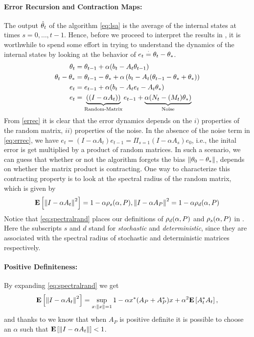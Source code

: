 \paragraph{Error Recursion and Contraction Maps:}
The output $\hat{\theta}_t$ of the algorithm \eqref{eq:lsa} is the average of the internal states at times $s=0,\ldots,t-1$. Hence, before we proceed to interpret the results in , it is worthwhile to spend some effort in trying to understand the dynamics of the internal states by looking at the behavior of $e_t\stackrel{\cdot}{=} \theta_t-\theta_*$.
\begin{align}\label{eq:errec}
\theta_t&=\theta_{t-1}+\alpha(b_t-A_t\theta_{t-1})\nonumber\\
\theta_t-\theta_*&=\theta_{t-1}-\theta_*+\alpha\left(b_t-A_t(\theta_{t-1}-\theta_*+\theta_*)\right)\nonumber\\
e_t&=e_{t-1}+\alpha(b_t-A_t e_t -A_t\theta_*)\nonumber\\
e_t&=\underbrace{((I-\alpha A_t))}_{\text{Random-Matrix}} e_{t-1}+\underbrace{\alpha(N_t -(M_t)\theta_*)}_{\text{Noise}}
\end{align}
From \eqref{errec} it is clear that the error dynamics depends on the $i)$ properties of the random matrix, $ii)$ properties of the noise. In the absence of the noise term in \eqref{eq:errec}, we have $e_t=(I-\alpha A_t) e_{t-1}=\Pi_{s=1}(I-\alpha A_s) e_0$, i.e., the inital error is get multiplied by a product of random matrices. In such a scenario, we can guess that whether or not the algorithm forgets the bias $\left\| \theta_0-\theta_*\right\|$, depends on whether the matrix product is contracting. One way to characterize this contracting property is to look at the spectral radius of the random matrix, which is given by
\begin{align}\label{eq:spectralrand}
\mathbf{E}\left[\left\| I-\alpha A_t\right\|^2\right]=1-\alpha \rho_s(\alpha,P), {\left\| I-\alpha A_P\right\|^2}=1-\alpha \rho_d(\alpha,P)
\end{align}
Notice that \eqref{eq:spectralrand} places our definitions of $\rho_d(\alpha,P)$ and $\rho_s(\alpha,P)$ in . Here the subscripts $s$ and $d$ stand for \emph{stochastic} and \emph{deterministic}, since they are associated with the spectral radius of stochastic and deterministic matrices respectively.\\
\paragraph{Positive Definiteness:} By expanding \eqref{eq:spectralrand} we get
\begin{align*}
\mathbf{E}\left[\left\| I-\alpha A_t\right\|^2\right]=\sup_{x:\left\| x\right\|=1} 1 -\alpha x^* (A_P+A_P^*)x +\alpha^2 \mathbf{E}\left[A_t^* A_t\right],
\end{align*}
and thanks to  we know that when $A_P$ is positive definite it is possible to choose an $\alpha$ such that $\mathbf{E}\left[\left\| I-\alpha A_t\right\|\right]<1$.
